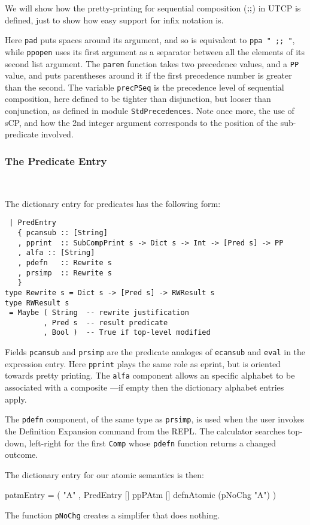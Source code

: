 We will show how the pretty-printing for
sequential composition  ($\mathrel{\mathbf{;\!;}}$) in UTCP is defined,
just to show how easy support for infix notation is.
Here \texttt{pad} puts spaces around its argument,
and so is equivalent to \verb$ppa " ;; "$,
while \texttt{ppopen} uses its first argument as a
separator between all the elements of its second list argument.
The \texttt{paren} function takes two precedence values,
and a \texttt{PP} value, and puts parentheses around it if the first precedence
number is greater than the second.
The variable \texttt{precPSeq} is the precedence level of sequential composition,
here defined to be tighter than disjunction,
but looser than conjunction, as defined in module \texttt{StdPrecedences}.
Note once more, the use of sCP, and how the 2nd integer argument
corresponds to the position of the sub-predicate involved.

\subsubsection{The Predicate Entry}~

The dictionary entry for predicates has the following form:
\begin{verbatim}
 | PredEntry 
   { pcansub :: [String]
   , pprint  :: SubCompPrint s -> Dict s -> Int -> [Pred s] -> PP
   , alfa :: [String]
   , pdefn   :: Rewrite s
   , prsimp  :: Rewrite s
   }
type Rewrite s = Dict s -> [Pred s] -> RWResult s
type RWResult s
 = Maybe ( String  -- rewrite justification
         , Pred s  -- result predicate
         , Bool )  -- True if top-level modified
\end{verbatim}


Fields \texttt{pcansub} and \texttt{prsimp} are the predicate analoges
of \texttt{ecansub} and \texttt{eval} in the expression entry.
Here \texttt{pprint} plays the same role as eprint,
but is oriented towards pretty printing.
The \texttt{alfa} component allows an specific alphabet to
be associated with a composite
---if empty then the dictionary alphabet entries apply.

The \texttt{pdefn} component, of the same type as \texttt{prsimp},
is used when the user invokes the Definition Expansion
command from the REPL.
The calculator searches top-down, left-right
    for the first \texttt{Comp} whose \texttt{pdefn} function
    returns a changed outcome.


The dictionary entry for our atomic semantics is then:
\begin{code}
patmEntry
 = ( "A"
   , PredEntry [] ppPAtm [] defnAtomic (pNoChg "A") )
\end{code}
The function \texttt{pNoChg} creates a simplifer that does nothing.
